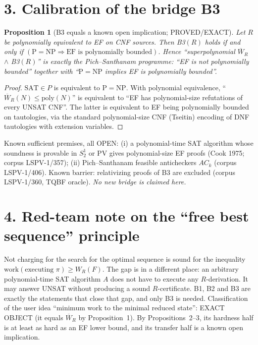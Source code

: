 \documentclass[11pt]{article}
\newtheorem{proposition}{Proposition}
\begin{document}
\section*{3. Calibration of the bridge B3}
\begin{proposition}[B3 equals a known open implication; PROVED/EXACT]
Let $R$ be polynomially equivalent to EF on CNF sources. Then
B3$(R)$ holds if and only if $(\mathrm{P}=\mathrm{NP}\Rightarrow \text{EF is polynomially bounded})$.
Hence ``superpolynomial $\overline W_R$ $\wedge$ B3$(R)$'' is exactly the Pich--Santhanam
programme: ``EF is not polynomially bounded'' together with ``$\mathrm{P}=\mathrm{NP}$
implies EF is polynomially bounded''.
\end{proposition}
\begin{proof}
$\mathrm{SAT}\in P$ is equivalent to $\mathrm{P}=\mathrm{NP}$. With polynomial equivalence,
``$\overline W_R(N)\le\mathrm{poly}(N)$'' is equivalent to ``EF has polynomial-size
refutations of every UNSAT CNF''. The latter is equivalent to EF being polynomially bounded
on tautologies, via the standard polynomial-size CNF (Tseitin) encoding of DNF tautologies
with extension variables.
\end{proof}
Known sufficient premises, all OPEN: (i) a polynomial-time SAT algorithm whose soundness is
provable in $S^1_2$ or PV gives polynomial-size EF proofs (Cook 1975; corpus LSPV-1/357);
(ii) Pich--Santhanam feasible anticheckers $AC_k$ (corpus LSPV-1/406).
Known barrier: relativizing proofs of B3 are excluded (corpus LSPV-1/360, TQBF oracle).
\emph{No new bridge is claimed here.}

\section*{4. Red-team note on the ``free best sequence'' principle}
Not charging for the search for the optimal sequence is sound for the inequality
$\text{work}(\text{executing }\pi)\ge W_R(F)$. The gap is in a different place: an arbitrary
polynomial-time SAT algorithm $A$ does not have to execute any $R$-derivation. It may
answer UNSAT without producing a sound $R$-certificate. B1, B2 and B3 are exactly the
statements that close that gap, and only B3 is needed. Classification of the user idea
``minimum work to the minimal reduced state'': EXACT OBJECT (it equals $\overline W_R$ by
Proposition~1). By Propositions~2--3, its hardness half is at least as hard as an EF lower
bound, and its transfer half is a known open implication.
\end{document}
